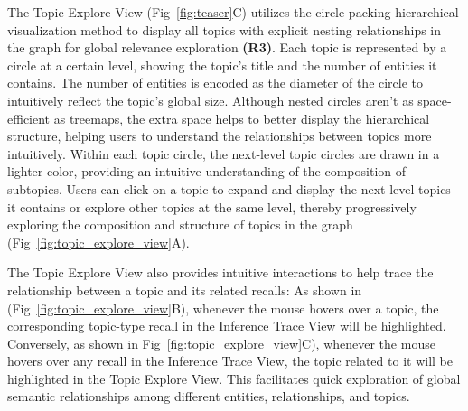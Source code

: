 The Topic Explore View (Fig~\ref{fig:teaser}C) utilizes the circle packing hierarchical visualization method to display all topics with explicit nesting relationships in the graph for global relevance exploration \textbf{(R3)}. Each topic is represented by a circle at a certain level, showing the topic's title and the number of entities it contains. The number of entities is encoded as the diameter of the circle to intuitively reflect the topic's global size. Although nested circles aren't as space-efficient as treemaps, the extra space helps to better display the hierarchical structure, helping users to understand the relationships between topics more intuitively. Within each topic circle, the next-level topic circles are drawn in a lighter color, providing an intuitive understanding of the composition of subtopics. Users can click on a topic to expand and display the next-level topics it contains or explore other topics at the same level, thereby progressively exploring the composition and structure of topics in the graph (Fig~\ref{fig:topic_explore_view}A).

The Topic Explore View also provides intuitive interactions to help trace the relationship between a topic and its related recalls: As shown in (Fig~\ref{fig:topic_explore_view}B), whenever the mouse hovers over a topic, the corresponding topic-type recall in the Inference Trace View will be highlighted. Conversely, as shown in Fig~\ref{fig:topic_explore_view}C), whenever the mouse hovers over any recall in the Inference Trace View, the topic related to it will be highlighted in the Topic Explore View. This facilitates quick exploration of global semantic relationships among different entities, relationships, and topics.





